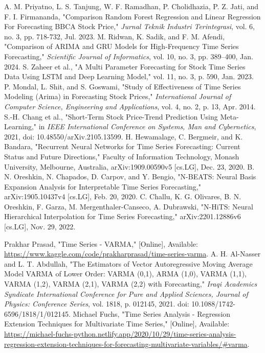 \begin{thebibliography}{00}
     A. M. Priyatno, L. S. Tanjung, W. F. Ramadhan, P. Cholidhazia, P. Z. Jati, and F. I. Firmananda, "Comparison Random Forest Regression and Linear Regression For Forecasting BBCA Stock Price," \textit{Jurnal Teknik Industri Terintegrasi}, vol. 6, no. 3, pp. 718-732, Jul. 2023.
     M. Ridwan, K. Sadik, and F. M. Afendi, "Comparison of ARIMA and GRU Models for High-Frequency Time Series Forecasting," \textit{Scientific Journal of Informatics}, vol. 10, no. 3, pp. 389–400, Jan. 2024.
     S. Zaheer et al., "A Multi Parameter Forecasting for Stock Time Series Data Using LSTM and Deep Learning Model," vol. 11, no. 3, p. 590, Jan. 2023.
     P. Mondal, L. Shit, and S. Goswami, "Study of Effectiveness of Time Series Modeling (Arima) in Forecasting Stock Prices," \textit{International Journal of Computer Science, Engineering and Applications}, vol. 4, no. 2, p. 13, Apr. 2014.
     S.-H. Chang et al., "Short-Term Stock Price-Trend Prediction Using Meta-Learning," in \textit{IEEE International Conference on Systems, Man and Cybernetics}, 2021, doi: 10.48550/arXiv.2105.13599.
     H. Hewamalage, C. Bergmeir, and K. Bandara, "Recurrent Neural Networks for Time Series Forecasting: Current Status and Future Directions," Faculty of Information Technology, Monash University, Melbourne, Australia, arXiv:1909.00590v5 [cs.LG], Dec. 23, 2020.
     B. N. Oreshkin, N. Chapados, D. Carpov, and Y. Bengio, "N-BEATS: Neural Basis Expansion Analysis for Interpretable Time Series Forecasting," arXiv:1905.10437v4 [cs.LG], Feb. 20, 2020.
     C. Challu, K. G. Olivares, B. N. Oreshkin, F. Garza, M. Mergenthaler-Canseco, A. Dubrawski, "N-HiTS: Neural Hierarchical Interpolation for Time Series Forecasting," arXiv:2201.12886v6 [cs.LG], Nov. 29, 2022.
    
     Prakhar Prasad, "Time Series - VARMA," [Online], Available: \url{https://www.kaggle.com/code/prakharprasad/time-series-varma}.
     A. H. Al-Nasser and L. T. Abdullah, "The Estimators of Vector Autoregressive Moving Average Model VARMA of Lower Order: VARMA (0,1), ARMA (1,0), VARMA (1,1), VARMA (1,2), VARMA (2,1), VARMA (2,2) with Forecasting," \textit{Iraqi Academics Syndicate International Conference for Pure and Applied Sciences, Journal of Physics: Conference Series}, vol. 1818, p. 012145, 2021. doi: 10.1088/1742-6596/1818/1/012145.
     Michael Fuchs, "Time Series Analysis - Regression Extension Techniques for Multivariate Time Series," [Online], Available: \url{https://michael-fuchs-python.netlify.app/2020/10/29/time-series-analysis-regression-extension-techniques-for-forecasting-multivariate-variables/#varma}.
    

\end{thebibliography}
